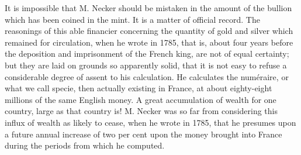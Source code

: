 It is impossible that M. Necker should be mistaken in the amount of the bullion which has been coined in the mint. It is a matter of official record. The reasonings of this able financier concerning the quantity of gold and silver which remained for circulation, when he wrote in 1785, that is, about four years before the deposition and imprisonment of the French king, are not of equal certainty; but they are laid on grounds so apparently solid, that it is not easy to refuse a considerable degree of assent to his calculation. He calculates the numéraire, or what we call specie, then actually existing in France, at about eighty-eight millions of the same English money. A great accumulation of wealth for one country, large as that country is! M. Necker was so far from considering this influx of wealth as likely to cease, when he wrote in 1785, that he presumes upon a future annual increase of two per cent upon the money brought into France during the periods from which he computed.

